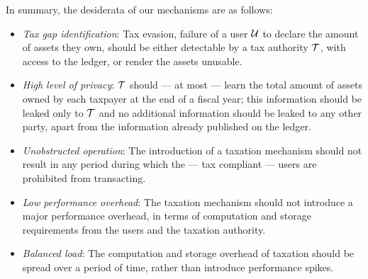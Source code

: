 In summary, the desiderata of our mechanisms are as follows:
\begin{itemize}
    \item \emph{Tax gap identification}: Tax evasion, \ie failure of a user
        $\mathcal{U}$ to declare the amount of assets they own, should be either
        detectable by a tax authority $\mathcal{T}$, with access to the
        ledger, or render the assets unusable.
    \item \emph{High level of privacy}: $\mathcal{T}$ should --- at most ---
        learn the total amount of assets owned by each taxpayer at the end of a
        fiscal year; this information should be leaked only to $\mathcal{T}$ and
        no additional information should be leaked to any other party, apart
        from the information already published on the ledger.
    \item \emph{Unobstructed operation}: The introduction of a taxation
        mechanism should not result in any period during which the --- tax
        compliant --- users are prohibited from transacting.
    \item \emph{Low performance overhead}: The taxation mechanism should not
        introduce a major performance overhead, in terms of computation and
        storage requirements from the users and the taxation authority.
    \item \emph{Balanced load}: The computation and storage overhead of
        taxation should be spread over a period of time, rather than introduce
        performance spikes.
\end{itemize}
